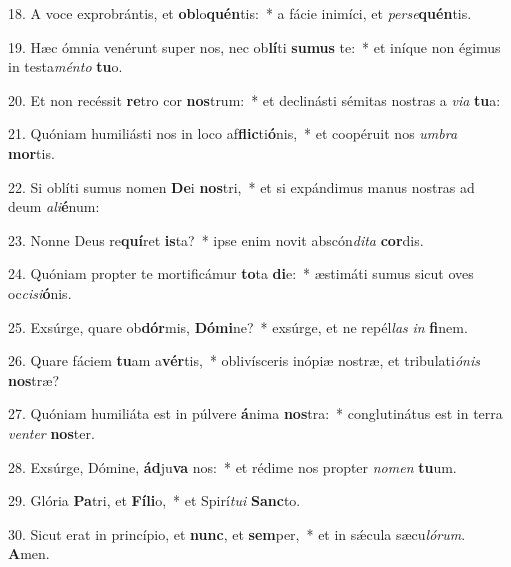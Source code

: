 18. A voce exprobrántis, et \textbf{ob}lo\textbf{quén}tis:~*  a fácie inimíci, et \textit{per}\textit{se}\textbf{quén}tis.\

19. Hæc ómnia venérunt super nos, nec ob\textbf{lí}ti \textbf{su}\textbf{mus} te:~*  et iníque non égimus in testa\textit{mén}\textit{to} \textbf{tu}o.\

20. Et non recéssit \textbf{re}tro cor \textbf{nos}trum:~*  et declinásti sémitas nostras a \textit{vi}\textit{a} \textbf{tu}a:\

21. Quóniam humiliásti nos in loco af\textbf{flic}ti\textbf{ó}nis,~*  et coopéruit nos \textit{um}\textit{bra} \textbf{mor}tis.\

22. Si oblíti sumus nomen \textbf{De}i \textbf{nos}tri,~*  et si expándimus manus nostras ad deum \textit{a}\textit{li}\textbf{é}num:\

23. Nonne Deus re\textbf{quí}ret \textbf{is}ta?~*  ipse enim novit abscón\textit{di}\textit{ta} \textbf{cor}dis.\

24. Quóniam propter te mortificámur \textbf{to}ta \textbf{di}e:~*  æstimáti sumus sicut oves oc\textit{ci}\textit{si}\textbf{ó}nis.\

25. Exsúrge, quare ob\textbf{dór}mis, \textbf{Dó}\textbf{mi}ne?~*  exsúrge, et ne repél\textit{las} \textit{in} \textbf{fi}nem.\

26. Quare fáciem \textbf{tu}am a\textbf{vér}tis,~*  oblivísceris inópiæ nostræ, et tribulati\textit{ó}\textit{nis} \textbf{nos}træ?\

27. Quóniam humiliáta est in púlvere \textbf{á}nima \textbf{nos}tra:~*  conglutinátus est in terra \textit{ven}\textit{ter} \textbf{nos}ter.\

28. Exsúrge, Dómine, \textbf{ád}ju\textbf{va} nos:~*  et rédime nos propter \textit{no}\textit{men} \textbf{tu}um.\

29. Glória \textbf{Pa}tri, et \textbf{Fí}\textbf{li}o,~*  et Spirí\textit{tu}\textit{i} \textbf{Sanc}to.\

30. Sicut erat in princípio, et \textbf{nunc}, et \textbf{sem}per,~*  et in sǽcula sæcu\textit{ló}\textit{rum}. \textbf{A}men.\

